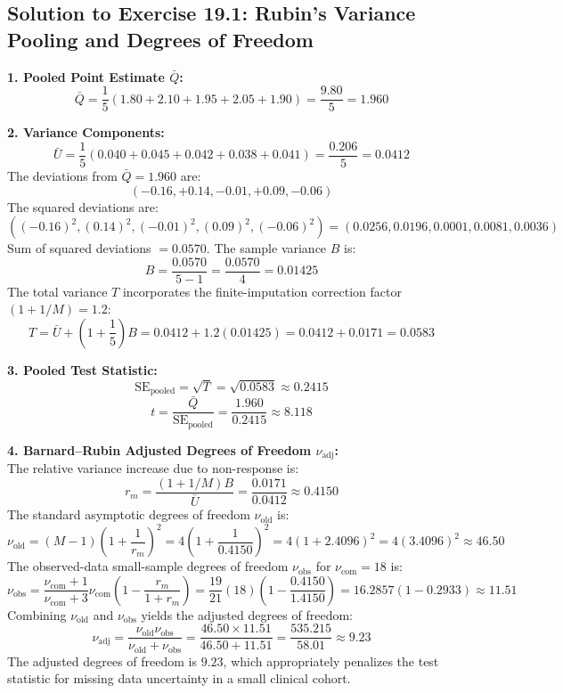 \documentclass[11pt,oneside]{book}
\begin{document}
\subsection*{Solution to Exercise 19.1: Rubin's Variance Pooling and Degrees of Freedom}

\textbf{1. Pooled Point Estimate $\bar{Q}$:}\\
$$\bar{Q} = \frac{1}{5}(1.80 + 2.10 + 1.95 + 2.05 + 1.90) = \frac{9.80}{5} = 1.960$$

\textbf{2. Variance Components:}\\
$$\bar{U} = \frac{1}{5}(0.040 + 0.045 + 0.042 + 0.038 + 0.041) = \frac{0.206}{5} = 0.0412$$
The deviations from $\bar{Q} = 1.960$ are:
$$(-0.16, +0.14, -0.01, +0.09, -0.06)$$
The squared deviations are:
$$((-0.16)^2, (0.14)^2, (-0.01)^2, (0.09)^2, (-0.06)^2) = (0.0256, 0.0196, 0.0001, 0.0081, 0.0036)$$
Sum of squared deviations $= 0.0570$.
The sample variance $B$ is:
$$B = \frac{0.0570}{5 - 1} = \frac{0.0570}{4} = 0.01425$$
The total variance $T$ incorporates the finite-imputation correction factor $(1 + 1/M) = 1.2$:
$$T = \bar{U} + \left(1 + \frac{1}{5}\right) B = 0.0412 + 1.2(0.01425) = 0.0412 + 0.0171 = 0.0583$$

\textbf{3. Pooled Test Statistic:}\\
$$\text{SE}_{\text{pooled}} = \sqrt{T} = \sqrt{0.0583} \approx 0.2415$$
$$t = \frac{\bar{Q}}{\text{SE}_{\text{pooled}}} = \frac{1.960}{0.2415} \approx 8.118$$

\textbf{4. Barnard--Rubin Adjusted Degrees of Freedom $\nu_{\text{adj}}$:}\\
The relative variance increase due to non-response is:
$$r_m = \frac{(1 + 1/M) B}{\bar{U}} = \frac{0.0171}{0.0412} \approx 0.4150$$
The standard asymptotic degrees of freedom $\nu_{\text{old}}$ is:
$$\nu_{\text{old}} = (M - 1)\left(1 + \frac{1}{r_m}\right)^2 = 4 \left(1 + \frac{1}{0.4150}\right)^2 = 4(1 + 2.4096)^2 = 4(3.4096)^2 \approx 46.50$$
The observed-data small-sample degrees of freedom $\nu_{\text{obs}}$ for $\nu_{\text{com}} = 18$ is:
$$\nu_{\text{obs}} = \frac{\nu_{\text{com}} + 1}{\nu_{\text{com}} + 3} \nu_{\text{com}} \left(1 - \frac{r_m}{1 + r_m}\right) = \frac{19}{21}(18)\left(1 - \frac{0.4150}{1.4150}\right) = 16.2857(1 - 0.2933) \approx 11.51$$
Combining $\nu_{\text{old}}$ and $\nu_{\text{obs}}$ yields the adjusted degrees of freedom:
$$\nu_{\text{adj}} = \frac{\nu_{\text{old}} \nu_{\text{obs}}}{\nu_{\text{old}} + \nu_{\text{obs}}} = \frac{46.50 \times 11.51}{46.50 + 11.51} = \frac{535.215}{58.01} \approx 9.23$$
The adjusted degrees of freedom is $9.23$, which appropriately penalizes the test statistic for missing data uncertainty in a small clinical cohort.
\end{document}
